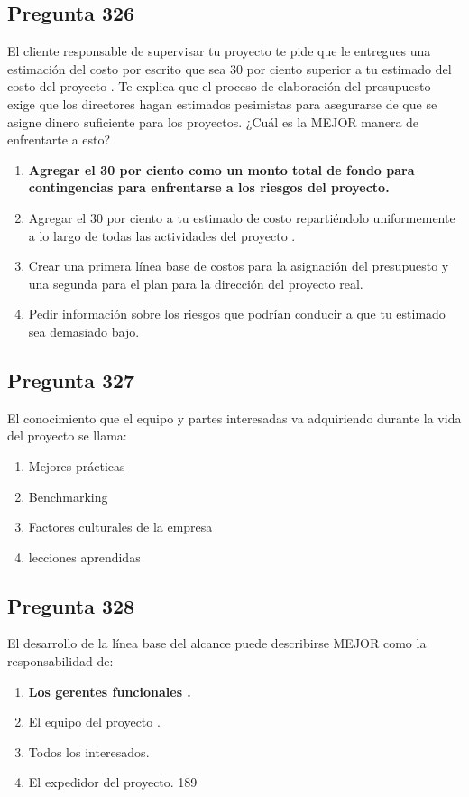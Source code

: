 \documentclass[11pt,a4paper]{article}
\begin{document}
\subsection*{Pregunta 326}
El cliente responsable de supervisar tu proyecto te pide que le entregues una estimación del costo por escrito que sea 30 por ciento superior a tu estimado del costo del proyecto . Te explica que el proceso de elaboración del presupuesto exige que los directores hagan estimados pesimistas para asegurarse de que se asigne dinero suficiente para los proyectos. ¿Cuál es la MEJOR manera de enfrentarte a esto?

\begin{enumerate}[label=\alph*)]
  \item \textbf{Agregar el 30 por ciento como un monto total de fondo para contingencias para enfrentarse a los riesgos del proyecto.}
  \item Agregar el 30 por ciento a tu estimado de costo repartiéndolo uniformemente a lo largo de todas las actividades del proyecto .
  \item Crear una primera línea base de costos para la asignación del presupuesto y una segunda para el plan para la dirección del proyecto real.
  \item Pedir información sobre los riesgos que podrían conducir a que tu estimado sea demasiado bajo.
\end{enumerate}

\subsection*{Pregunta 327}
El conocimiento que el equipo y partes interesadas va adquiriendo durante la vida del proyecto se llama:

\begin{enumerate}[label=\alph*)]
  \item Mejores prácticas
  \item Benchmarking
  \item Factores culturales de la empresa
  \item lecciones aprendidas
\end{enumerate}

\subsection*{Pregunta 328}
El desarrollo de la línea base del alcance puede describirse MEJOR como la responsabilidad de:

\begin{enumerate}[label=\alph*)]
  \item \textbf{Los gerentes funcionales .}
  \item El equipo del proyecto .
  \item Todos los interesados.
  \item El expedidor del proyecto. 189
\end{enumerate}
\end{document}

